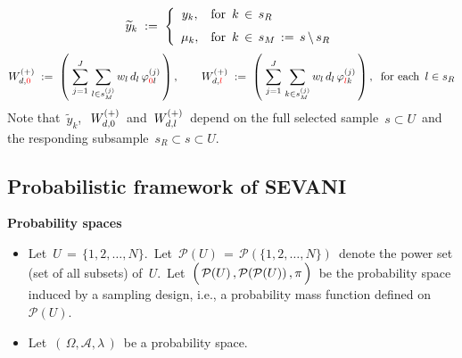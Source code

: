 \begin{equation*}
\widetilde{y}_{k}
\; := \;
    \left\{\begin{array}{cl}
        y_{k}, & \textnormal{for \,$k \,\in\, s_{R}$}
        \\
        \overset{{\color{white}\textnormal{\large1}}}{\mu_{k}}, & \textnormal{for \,$k \,\in\, s_{M} \,:=\, s \,\backslash\, s_{R}$}
        \end{array}\right.
\end{equation*}
\begin{equation*}
W^{(+)}_{d,{\color{red}0}}
\; := \;
    \left(\;
        \overset{J}{\underset{j=1}{\sum}}\;
        \underset{l \in s_{M}^{(j)}}{\sum}\,
        w_{l}\,d_{l}\,\varphi^{(j)}_{{\color{red}0}l}
        \,\right),
\quad\quad
W^{(+)}_{d,{\color{red}l}}
\; := \;
    \left(\;
        \overset{J}{\underset{j=1}{\sum}}\;
        \underset{k \in s_{M}^{(j)}}{\sum}\,
        w_{l}\,d_{l}\,\varphi^{(j)}_{{\color{red}l}k}
        \,\right),
\;\;
\textnormal{for each \,$l \in s_{R}$}
\end{equation*}
\vskip 0.3cm
\noindent
Note that
\,$\widetilde{y}_{k}$,\,
\,$W^{(+)}_{d,{\color{black}0}}$\,
and
\,$W^{(+)}_{d,{\color{black}l}}$\,
depend on the full selected sample
\,$s \subset U$\,
and the responding subsample
\,$s_{R} \subset s \subset U$.\,


\vskip 1.0cm
\subsection{Probabilistic framework of SEVANI \cite{Beaumont2011}}
\label{DomainTotalProbabilisticFramework}
\setcounter{theorem}{0}


\noindent
\textbf{Probability spaces}
\begin{itemize}
\item
    Let
    \,$U \,=\, \{1,2,\ldots,N\}$.\,
    Let
    \,$\mathcal{P}(U) \,=\, \mathcal{P}(\{1,2,\ldots,N\})$\,
    denote the power set (set of all subsets) of \,$U$.\,
    Let
    \,$\left(\,\mathcal{P}(U)\,,\mathcal{P}(\mathcal{P}(U))\,,\overset{{\color{white}-}}{\pi}\,\right)$\,
    be the probability space induced by a sampling design, i.e.,
    a probability mass function defined on
    \,$\mathcal{P}(U)$.\,
\item
    Let \,$\left(\,\Omega,\mathscr{A},\lambda\,\right)$\, be a probability space.
\end{itemize}

